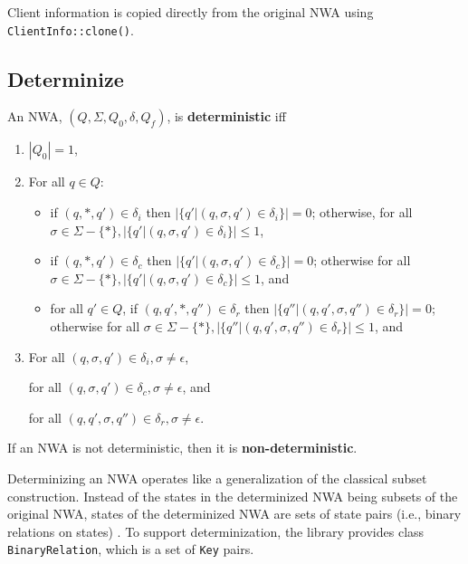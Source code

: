 Client
information is copied directly from the original NWA using
\texttt{ClientInfo::clone()}.

\subsection{Determinize}
\label{Se:Determinize}

\begin{definition}
An NWA, $(Q,\Sigma,Q_0,\delta,Q_f)$, is \textbf{deterministic} iff 

\begin{enumerate} 

\item $|Q_0| = 1$, 

\item For all $q \in Q$: 
  \begin{itemize}
    \item if $(q,*,q') \in \delta_i$ then $|\{q'|(q,\sigma,q') \in
      \delta_i\}| = 0$; otherwise, for all $\sigma \in \Sigma - \{*\},
      |\{q'|(q,\sigma,q') \in \delta_i\}| \leq 1$,

    \item if $(q,*,q') \in \delta_c$ then $ |\{q'|(q,\sigma,q') \in
      \delta_c\}| = 0$; otherwise for all $\sigma \in \Sigma - \{*\},
      |\{q'|(q,\sigma,q') \in \delta_c\}| \leq 1$, and

    \item for all $q' \in Q$, if $(q,q',*,q'') \in \delta_r$ then
      $|\{q''|(q,q',\sigma,q'') \in \delta_r\}| = 0$; otherwise for all
      $\sigma \in \Sigma - \{*\}, |\{q''|(q,q',\sigma,q'') \in \delta_r\}|
      \leq 1$, and
  \end{itemize}
\item For all $(q,\sigma,q') \in \delta_i, \sigma \neq \epsilon$,

 for all $(q,\sigma,q') \in \delta_c, \sigma \neq \epsilon$,  and 

 for all $(q,q',\sigma,q'') \in \delta_r, \sigma \neq \epsilon$.\\

\end{enumerate}

If an NWA is not deterministic, then it is \textbf{non-deterministic}.
\end{definition}

Determinizing an NWA operates like a
generalization of the classical subset construction.  Instead of the states
in the determinized NWA being subsets of the original NWA, states of the
determinized NWA are sets of state pairs (i.e., binary relations on states)
\cite{JACM:AM2009}.  To support determinization, the library provides class
\texttt{BinaryRelation}, which is a set of \texttt{Key} pairs. 



